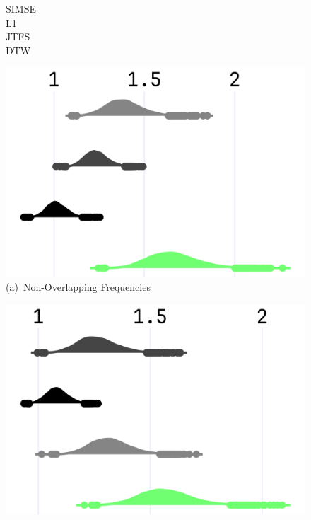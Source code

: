 \begin{figure}[t]
  \centering
  \begin{minipage}[t]{\textwidth}
    \begin{minipage}[t]{0.045\textwidth}
      \footnotesize\raggedleft
      \vspace{-2.75cm} %
      SIMSE\\[0.4cm]
      L1\\[0.385cm]
      JTFS\\[0.365cm]
      DTW
    \end{minipage}%
    \hspace{0.01\textwidth}%
    \begin{minipage}[t]{0.91\textwidth}
      \centering
      \begin{minipage}[t]{0.31\textwidth}
        \centering
        \includegraphics[width=\linewidth]{images/npsk_ood_P_Loss_0.png}
        \vspace{0.3em}
        \footnotesize (a)~Non-Overlapping Frequencies
      \end{minipage}
      \hspace{0.015\textwidth}%
      \begin{minipage}[t]{0.31\textwidth}
        \centering
        \includegraphics[width=\linewidth]{images/npsk_ood_P_Loss_1.png}

\end{minipage}
\end{minipage}
\end{minipage}
\end{figure}
